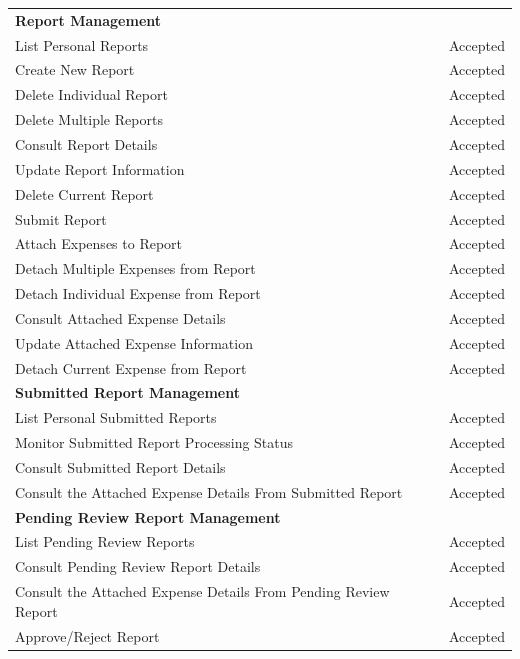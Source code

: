 \begin{longtable}{p{} p{}}
    \rowcolor{gray!20}
    \textbf{Report Management} & \\ 
    \rowcolor{gray!05}
    List Personal Reports & Accepted \\
    \rowcolor{gray!05}
    Create New Report & Accepted \\
    \rowcolor{gray!05}
    Delete Individual Report & Accepted \\
    \rowcolor{gray!05}
    Delete Multiple Reports & Accepted \\
    \rowcolor{gray!05}
    Consult Report Details & Accepted \\
    \rowcolor{gray!05}
    Update Report Information & Accepted \\
    \rowcolor{gray!05}
    Delete Current Report & Accepted \\
    \rowcolor{gray!05}
    Submit Report & Accepted \\
    \rowcolor{gray!05}
    Attach Expenses to Report & Accepted \\
    \rowcolor{gray!05}
    Detach Multiple Expenses from Report & Accepted \\
    \rowcolor{gray!05}
    Detach Individual Expense from Report & Accepted \\
    \rowcolor{gray!05}
    Consult Attached Expense Details & Accepted \\
    \rowcolor{gray!05}
    Update Attached Expense Information & Accepted \\
    \rowcolor{gray!05}
    Detach Current Expense from Report & Accepted \\

    \rowcolor{gray!20}
    \textbf{Submitted Report Management} & \\ 
    \rowcolor{gray!05}
    List Personal Submitted Reports & Accepted \\
    \rowcolor{gray!05}
    Monitor Submitted Report Processing Status & Accepted \\
    \rowcolor{gray!05}
    Consult Submitted Report Details & Accepted \\
    \rowcolor{gray!05}
    Consult the Attached Expense Details From Submitted Report & Accepted \\
    \rowcolor{gray!05}

    \rowcolor{gray!20}
    \textbf{Pending Review Report Management} & \\ 
    \rowcolor{gray!05}
    List Pending Review Reports & Accepted \\
    \rowcolor{gray!05}
    Consult Pending Review Report Details & Accepted \\
    \rowcolor{gray!05}
    Consult the Attached Expense Details From Pending Review Report & Accepted \\
    \rowcolor{gray!05}
    Approve/Reject Report & Accepted \\


\end{longtable}
